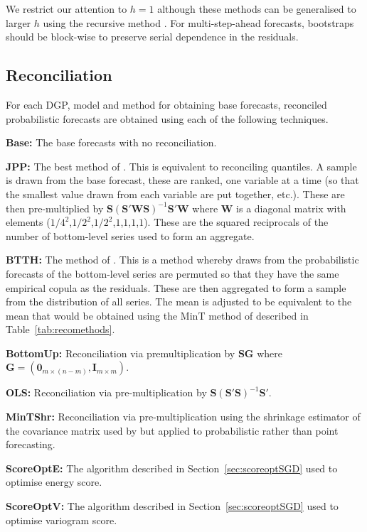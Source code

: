 \documentclass[a4paper,12pt]{article}
\theoremstyle{definition}
\begin{document}
We restrict our attention to $h=1$ although these methods can be generalised to larger $h$ using the recursive method \citep{FPP2018}. For multi-step-ahead forecasts, bootstraps should be block-wise to preserve serial dependence in the residuals.

\subsection{Reconciliation}

For each DGP, model and method for obtaining base forecasts, reconciled probabilistic forecasts are obtained using each of the following techniques.
\begin{compactitem}
	\item \textbf{Base:} The base forecasts with no reconciliation.
	\item \textbf{JPP:} The best method of \cite{JeoEtAl2019}. This is equivalent to reconciling quantiles. A sample is drawn from the base forecast, these are ranked, one variable at a time (so that the smallest value drawn from each variable are put together, etc.). These are then pre-multiplied by $\bm{S}\left(\bm{S}'\bm{W}\bm{S}\right)^{-1}\bm{S}'\bm{W}$ where $\bm{W}$ is a diagonal matrix with elements ($1/4^2$,$1/2^2$,$1/2^2$,$1$,$1$,$1$,$1$). These are the squared reciprocals of the number of bottom-level series used to form an aggregate.
	\item \textbf{BTTH:} The method of \cite{Taieb2017}. This is a method whereby draws from the probabilistic forecasts of the bottom-level series are permuted so that they have the same empirical copula as the residuals. These are then aggregated to form a sample from the distribution of all series. The mean is adjusted to be equivalent to the mean that would be obtained using the MinT method of \cite{WicEtAl2019} described in Table~\ref{tab:recomethods}.
	\item \textbf{BottomUp:} Reconciliation via premultiplication by $\bm{S}\bm{G}$ where $\bm{G}=\left(\bm{0}_{m\times(n-m)},\bm{I}_{m\times m}\right)$.
	\item \textbf{OLS:} Reconciliation via pre-multiplication by $\bm{S}\left(\bm{S}'\bm{S}\right)^{-1}\bm{S}'$.
	\item \textbf{MinTShr:} Reconciliation via pre-multiplication using the shrinkage estimator of the covariance matrix used by \cite{WicEtAl2019} but applied to probabilistic rather than point forecasting.
	\item \textbf{ScoreOptE:} The algorithm described in Section~\ref{sec:scoreoptSGD} used to optimise energy score.
	\item \textbf{ScoreOptV:} The algorithm described in Section~\ref{sec:scoreoptSGD} used to optimise variogram score.
\end{compactitem}
\end{document}
